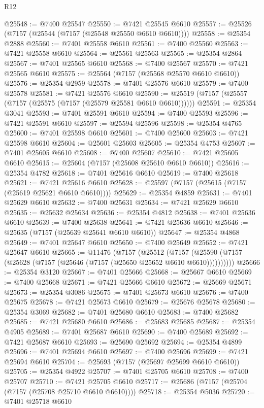 \begin{lexlean}{R12}
\begin{coremodule}
@25548 := @7400 @25547
@25550 := @7421 @25545 @6610
@25557 := @25526 (@7157 (@25544 (@7157 (@25548 @25550 @6610 @6610))))
@25558 := @25354 @2888
@25560 := @7401 @25558 @6610
@25561 := @7400 @25560
@25563 := @7421 @25558 @6610
@25564 := @25561 @25563
@25565 := @25354 @2864
@25567 := @7401 @25565 @6610
@25568 := @7400 @25567
@25570 := @7421 @25565 @6610
@25575 := @25564 (@7157 (@25568 @25570 @6610 @6610))
@25576 := @25354 @2959
@25578 := @7401 @25576 @6610
@25579 := @7400 @25578
@25581 := @7421 @25576 @6610
@25590 := @25519 (@7157 (@25557 (@7157 (@25575 (@7157 (@25579 @25581 @6610 @6610))))))
@25591 := @25354 @3041
@25593 := @7401 @25591 @6610
@25594 := @7400 @25593
@25596 := @7421 @25591 @6610
@25597 := @25594 @25596
@25598 := @25354 @4765
@25600 := @7401 @25598 @6610
@25601 := @7400 @25600
@25603 := @7421 @25598 @6610
@25604 := @25601 @25603
@25605 := @25354 @4753
@25607 := @7401 @25605 @6610
@25608 := @7400 @25607
@25610 := @7421 @25605 @6610
@25615 := @25604 (@7157 (@25608 @25610 @6610 @6610))
@25616 := @25354 @4782
@25618 := @7401 @25616 @6610
@25619 := @7400 @25618
@25621 := @7421 @25616 @6610
@25628 := @25597 (@7157 (@25615 (@7157 (@25619 @25621 @6610 @6610))))
@25629 := @25354 @4859
@25631 := @7401 @25629 @6610
@25632 := @7400 @25631
@25634 := @7421 @25629 @6610
@25635 := @25632 @25634
@25636 := @25354 @4812
@25638 := @7401 @25636 @6610
@25639 := @7400 @25638
@25641 := @7421 @25636 @6610
@25646 := @25635 (@7157 (@25639 @25641 @6610 @6610))
@25647 := @25354 @4868
@25649 := @7401 @25647 @6610
@25650 := @7400 @25649
@25652 := @7421 @25647 @6610
@25665 := @11476
    (@7157
      (@25512
        (@7157 (@25590 (@7157 (@25628 (@7157 (@25646 (@7157 (@25650 @25652 @6610 @6610))))))))))
@25666 := @25354 @3120
@25667 := @7401 @25666
@25668 := @25667 @6610
@25669 := @7400 @25668
@25671 := @7421 @25666 @6610
@25672 := @25669 @25671
@25673 := @25354 @3086
@25675 := @7401 @25673 @6610
@25676 := @7400 @25675
@25678 := @7421 @25673 @6610
@25679 := @25676 @25678
@25680 := @25354 @3069
@25682 := @7401 @25680 @6610
@25683 := @7400 @25682
@25685 := @7421 @25680 @6610
@25686 := @25683 @25685
@25687 := @25354 @4905
@25689 := @7401 @25687 @6610
@25690 := @7400 @25689
@25692 := @7421 @25687 @6610
@25693 := @25690 @25692
@25694 := @25354 @4899
@25696 := @7401 @25694 @6610
@25697 := @7400 @25696
@25699 := @7421 @25694 @6610
@25704 := @25693 (@7157 (@25697 @25699 @6610 @6610))
@25705 := @25354 @4922
@25707 := @7401 @25705 @6610
@25708 := @7400 @25707
@25710 := @7421 @25705 @6610
@25717 := @25686 (@7157 (@25704 (@7157 (@25708 @25710 @6610 @6610))))
@25718 := @25354 @5036
@25720 := @7401 @25718 @6610

\end{coremodule}
\end{lexlean}
